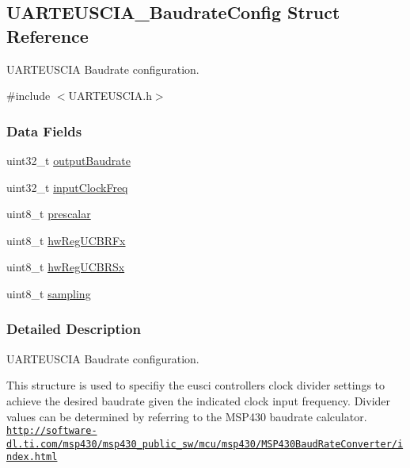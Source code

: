 \subsection{U\+A\+R\+T\+E\+U\+S\+C\+I\+A\+\_\+\+Baudrate\+Config Struct Reference}
\label{struct_u_a_r_t_e_u_s_c_i_a___baudrate_config}


U\+A\+R\+T\+E\+U\+S\+C\+I\+A Baudrate configuration.  




{\ttfamily \#include $<$U\+A\+R\+T\+E\+U\+S\+C\+I\+A.\+h$>$}

\subsubsection*{Data Fields}
\begin{DoxyCompactItemize}
\item 
uint32\+\_\+t \hyperlink{struct_u_a_r_t_e_u_s_c_i_a___baudrate_config_ada91b2d393daca5c8f17637811729eba}{output\+Baudrate}
\item 
uint32\+\_\+t \hyperlink{struct_u_a_r_t_e_u_s_c_i_a___baudrate_config_a3ab151619c7b7f4f8f568f340616a534}{input\+Clock\+Freq}
\item 
uint8\+\_\+t \hyperlink{struct_u_a_r_t_e_u_s_c_i_a___baudrate_config_acd9d45cff4ae80010082867aa49e6e08}{prescalar}
\item 
uint8\+\_\+t \hyperlink{struct_u_a_r_t_e_u_s_c_i_a___baudrate_config_a486441ac0287eee5d2f1cec429ca7a84}{hw\+Reg\+U\+C\+B\+R\+Fx}
\item 
uint8\+\_\+t \hyperlink{struct_u_a_r_t_e_u_s_c_i_a___baudrate_config_a644a24cfb8503deef280eb7142e98cbf}{hw\+Reg\+U\+C\+B\+R\+Sx}
\item 
uint8\+\_\+t \hyperlink{struct_u_a_r_t_e_u_s_c_i_a___baudrate_config_a9c18d479e91a0b5258fcd1821c09cf2e}{sampling}
\end{DoxyCompactItemize}


\subsubsection{Detailed Description}
U\+A\+R\+T\+E\+U\+S\+C\+I\+A Baudrate configuration. 

This structure is used to specifiy the eusci controller\textquotesingle{}s clock divider settings to achieve the desired baudrate given the indicated clock input frequency. Divider values can be determined by referring to the M\+S\+P430 baudrate calculator. \href{http://software-dl.ti.com/msp430/msp430_public_sw/mcu/msp430/MSP430BaudRateConverter/index.html}{\tt http\+://software-\/dl.\+ti.\+com/msp430/msp430\+\_\+public\+\_\+sw/mcu/msp430/\+M\+S\+P430\+Baud\+Rate\+Converter/index.\+html}

